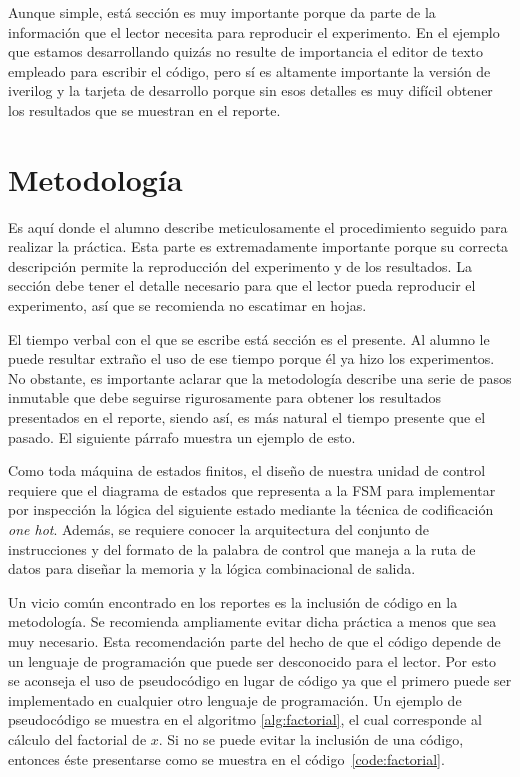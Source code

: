 \documentclass[12pt]{article}
\begin{document}
Aunque simple, está sección es muy importante porque da parte de la información 
que el lector necesita para reproducir el experimento. En el ejemplo que estamos 
desarrollando quizás no resulte de importancia el editor de texto empleado para 
escribir el código, pero sí es altamente importante la versión de iverilog y la 
tarjeta de desarrollo porque sin esos detalles es muy difícil obtener los 
resultados que se muestran en el reporte.

\section{Metodología}\label{sec:methodology}

Es aquí donde el alumno describe meticulosamente el procedimiento seguido para 
realizar la práctica. Esta parte es extremadamente importante porque su correcta 
descripción permite la reproducción del experimento y de los resultados. La 
sección debe tener el detalle necesario para que el lector pueda reproducir el 
experimento, así que se recomienda no escatimar en hojas.

El tiempo verbal con el que se escribe está sección es el presente. Al alumno 
le puede resultar extraño el uso de ese tiempo porque él ya hizo los 
experimentos. No obstante, es importante aclarar que la metodología describe 
una serie de pasos inmutable que debe seguirse rigurosamente para obtener los 
resultados presentados en el reporte, siendo así, es más natural el tiempo 
presente que el pasado. El siguiente párrafo muestra un ejemplo de esto.

Como toda máquina de estados finitos, el diseño de nuestra unidad de control 
requiere que el diagrama de estados que representa a la FSM para implementar 
por inspección la lógica del siguiente estado mediante la técnica de 
codificación \textit{one hot}. Además, se requiere conocer la arquitectura del 
conjunto de instrucciones y del formato de la palabra de control que maneja a 
la ruta de datos para diseñar la memoria y la lógica combinacional de salida.

Un vicio común encontrado en los reportes es la inclusión de código en la 
metodología. Se recomienda ampliamente evitar dicha práctica a menos que sea 
muy necesario. Esta recomendación parte del hecho de que el código depende de 
un lenguaje de programación que puede ser desconocido para el lector. Por esto 
se aconseja el uso de pseudocódigo en lugar de código ya que el primero puede 
ser implementado en cualquier otro lenguaje de programación. Un ejemplo de 
pseudocódigo se muestra en el algoritmo \ref{alg:factorial}, el cual 
corresponde al cálculo del factorial de $x$. Si no se puede evitar la 
inclusión de una código, entonces éste presentarse como se muestra en el 
código~\ref{code:factorial}.
\end{document}
